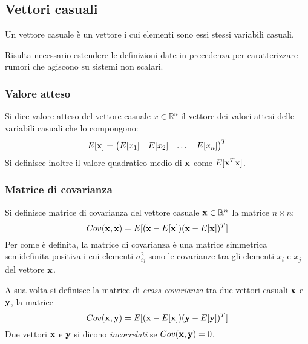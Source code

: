 \newpage
\subsection{Vettori casuali}

Un vettore casuale è un vettore i cui elementi sono essi stessi variabili casuali.

Risulta necessario estendere le definizioni date in precedenza per caratterizzare rumori che agiscono su sistemi non scalari.

\subsubsection{Valore atteso}

Si dice valore atteso del vettore casuale $x \in \mathbb{R}^n$ il vettore dei valori attesi delle variabili casuali che lo compongono: \[E[\mathbf{x}] = \begin{pmatrix}
E[x_1] & E[x_2] & \dots & E[x_n]
\end{pmatrix}^T
\]
Si definisce inoltre il valore quadratico medio di $\mathbf{x}$ come $E[\mathbf{x}^T \mathbf{x}]$.

\subsubsection{Matrice di covarianza}

Si definisce matrice di covarianza del vettore casuale $\mathbf{x} \in \mathbb{R}^n$ la matrice $n \times n$: \[ Cov(\mathbf{x}, \mathbf{x}) = E[(\mathbf{x}-E[\mathbf{x}])(\mathbf{x}-E[\mathbf{x}])^T]\]
Per come è definita, la matrice di covarianza è una matrice simmetrica semidefinita positiva i cui elementi $\sigma^2_{ij}$ sono le covarianze tra gli elementi $x_i$ e $x_j$ del vettore $\mathbf{x}$.

A sua volta si definisce la matrice di \textit{cross-covarianza} tra due vettori casuali $\mathbf{x}$ e $\mathbf{y}$, la matrice \[ Cov(\mathbf{x}, \mathbf{y}) = E[(\mathbf{x}-E[\mathbf{x}])(\mathbf{y}-E[\mathbf{y}])^T]\]
Due vettori $\mathbf{x}$ e $\mathbf{y}$ si dicono \textit{incorrelati} se $Cov(\mathbf{x},\mathbf{y}) = 0$.
\newpage